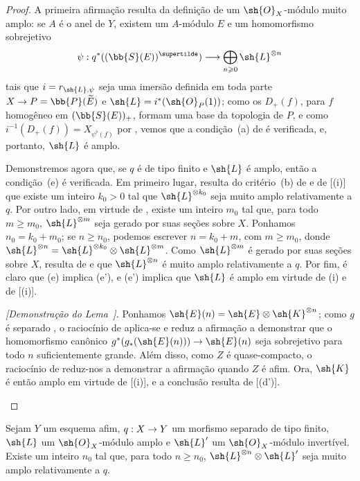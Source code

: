 \documentclass[oneside,10pt]{amsart}
\makeatletter
\renewcommand{\geq}{\geqslant}
\newcommand{\ega@arrow}[2]{\mathchoice{#1}{#2}{#2}{#2}}
\renewcommand{\to}{\ega@arrow{\longrightarrow}{\rightarrow}}
\newcommand{\oldpage}[2][]{\marginnote{\normalfont\footnotesize\textbf{#1}~|~#2}\ignorespaces}
\let\EGAOriginalLabel\label
\renewcommand{\label}[1]{\phantomsection\EGAOriginalLabel{#1}}
\makeatother
\begin{document}
\begin{proof}
A primeira afirmação resulta da definição  de um $\sh{O}_X$-módulo muito amplo:
se $A$ é o anel de $Y$, existem um $A$-módulo $E$ e um homomorfismo sobrejetivo
\[
  \psi:q^*((\bb{S}(E))^{\supertilde})\to\bigoplus_{n\geq0}\sh{L}^{\otimes n}
\]
tais que $i=r_{\sh{L},\psi}$ seja uma imersão definida em toda parte $X\to P=\bb{P}(\widetilde{E})$ e $\sh{L}=i^*(\sh{O}_P(1))$;
como os $D_+(f)$, para $f$ homogêneo em $(\bb{S}(E))_+$, formam uma base da topologia de $P$, e como $i^{-1}(D_+(f))=X_{\psi^\flat(f)}$ por , vemos que a condição~(a) de  é verificada, e, portanto, $\sh{L}$ é amplo.

Demonstremos agora que, se $q$ é de tipo finito e $\sh{L}$ é amplo, então a condição~(e) é verificada.
Em primeiro lugar, resulta do critério~(b) de  e de [(i)] que existe
\oldpage[II]{87}
um inteiro $k_0>0$ tal que $\sh{L}^{\otimes k_0}$ seja muito amplo relativamente a $q$.
Por outro lado, em virtude de , existe um inteiro $m_0$ tal que, para todo $m\geq m_0$, $\sh{L}^{\otimes m}$ seja gerado por suas seções sobre $X$.
Ponhamos $n_0=k_0+m_0$;
se $n\geq n_0$, podemos escrever $n=k_0+m$, com $m\geq m_0$, donde $\sh{L}^{\otimes n}=\sh{L}^{\otimes k_0}\otimes\sh{L}^{\otimes m}$.
Como $\sh{L}^{\otimes m}$ é gerado por suas seções sobre $X$, resulta de  e  que $\sh{L}^{\otimes n}$ é muito amplo relativamente a $q$.
Por fim, é claro que (e) implica (e'), e (e') implica que $\sh{L}$ é amplo em virtude de (i) e de [(i)].

  \begin{env}[4.5.10.1]
  \label{II.4.5.10.1}
  \emph{[Demonstração do Lema~].}
  Ponhamos $\sh{E}(n)=\sh{E}\otimes\sh{K}^{\otimes n}$;
  como $g$ é separado , o raciocínio de  aplica-se e reduz a afirmação a demonstrar que o homomorfismo canônico $g^*(g_*(\sh{E}(n)))\to\sh{E}(n)$ seja sobrejetivo para todo $n$ suficientemente grande.
  Além disso, como $Z$ é quase-compacto, o raciocínio de  reduz-nos a demonstrar a afirmação quando $Z$ é afim.
  Ora, $\sh{K}$ é então amplo em virtude de [(i)], e a conclusão resulta de [(d')].
  \end{env}
\end{proof}

\begin{corollary}[4.5.11]
\label{II.4.5.11}
Sejam $Y$ um esquema afim, $q:X\to Y$ um morfismo separado de tipo finito, $\sh{L}$ um $\sh{O}_X$-módulo amplo e $\sh{L}'$ um $\sh{O}_X$-módulo invertível.
Existe um inteiro $n_0$ tal que, para todo $n\geq n_0$, $\sh{L}^{\otimes n}\otimes\sh{L}'$ seja muito amplo relativamente a $q$.
\end{corollary}
\end{document}
